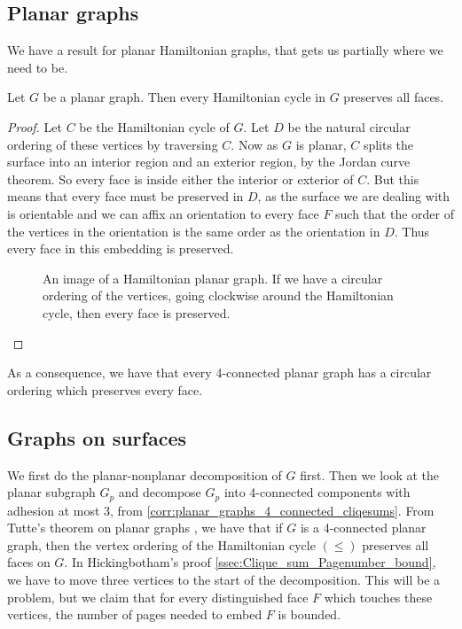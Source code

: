 \subsection{Planar graphs}

We have a result for planar Hamiltonian graphs, that gets us partially where we need to be.
\begin{theorem}
	Let \(G\) be a planar graph. Then every Hamiltonian cycle in \(G\) preserves all faces.
\end{theorem}

\begin{proof}
	Let \(C\) be the Hamiltonian cycle of \(G\). Let \(D\) be the natural circular ordering of these vertices by traversing \(C\). Now as \(G\) is planar, \(C\) splits the surface into an interior region and an exterior region, by the Jordan curve theorem. So every face is inside either the interior or exterior of \(C\). But this means that every face must be preserved in \(D\), as the surface we are dealing with is orientable and we can affix an orientation to every face \(F\) such that the order of the vertices in the orientation is the same order as the orientation in \(D\). Thus every face in this embedding is preserved.
	\begin{figure}
		\centering
		
		\caption{An image of a Hamiltonian planar graph. If we have a circular ordering of the vertices, going clockwise around the Hamiltonian cycle, then every face is preserved.}\label{fig:hamiltonian_planar}
	\end{figure}
\end{proof}
As a consequence, we have that every 4-connected planar graph has a circular ordering which preserves every face.

\subsection{Graphs on surfaces}

We first do the planar-nonplanar decomposition of \(G\) first.
Then we look at the planar subgraph \(G_p\) and decompose \(G_p\) into 4-connected components with adhesion at most 3, from \cref{corr:planar_graphs_4_connected_cliqesums}.
From Tutte's theorem on planar graphs \cite{tutteTheoremPlanarGraphs1956}, we have that if \(G\) is a 4-connected planar graph, then the vertex ordering of the Hamiltonian cycle \((\leq)\) preserves all faces on \(G\).
In Hickingbotham's proof \cref{ssec:Clique_sum_Pagenumber_bound}, we have to move three vertices to the start of the decomposition. This will be a problem, but we claim that for every distinguished face \(F\) which touches these vertices, the number of pages needed to embed \(F\) is bounded.

